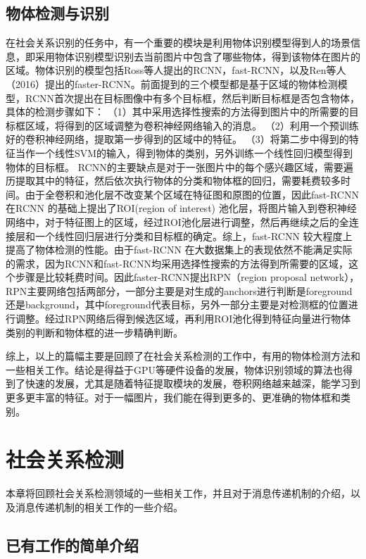 \subsection{物体检测与识别}

在社会关系识别的任务中，有一个重要的模块是利用物体识别模型得到人的场景信息，即采用物体识别模型识别去当前图片中包含了哪些物体，得到该物体在图片的区域。物体识别的模型包括Ross等人提出的RCNN\cite{DBLP:conf/cvpr/GirshickDDM14}，fast-RCNN\cite{DBLP:conf/iccv/Girshick15}，以及Ren等人（2016）\cite{DBLP:conf/nips/RenHGS15}提出的faster-RCNN。前面提到的三个模型都是基于区域的物体检测模型，RCNN\cite{DBLP:conf/cvpr/GirshickDDM14}首次提出在目标图像中有多个目标框，然后判断目标框是否包含物体，具体的检测步骤如下：
（1）其中采用选择性搜索的方法得到图片中的所需要的目标框区域，将得到的区域调整为卷积神经网络输入的消息。
（2）利用一个预训练好的卷积神经网络，提取第一步得到的区域中的特征。
（3）将第二步中得到的特征当作一个线性SVM的输入，得到物体的类别，另外训练一个线性回归模型得到物体的目标框。
RCNN的主要缺点是对于一张图片中的每个感兴趣区域，需要遍历提取其中的特征，然后依次执行物体的分类和物体框的回归，需要耗费较多时间。由于全卷积和池化层不改变某个区域在特征图和原图的位置，因此fast-RCNN 在RCNN 的基础上提出了ROI(region of interest) 池化层，将图片输入到卷积神经网络中，对于特征图上的区域，经过ROI池化层进行调整，然后再继续之后的全连接层和一个线性回归层进行分类和目标框的确定。综上，fast-RCNN 较大程度上提高了物体检测的性能。由于fast-RCNN 在大数据集上的表现依然不能满足实际的需求，因为RCNN和fast-RCNN均采用选择性搜索的方法得到所需要的区域，这个步骤是比较耗费时间。因此faster-RCNN提出RPN（region proposal network），RPN主要网络包括两部分，一部分主要是对生成的anchors进行判断是foreground还是background，其中foreground代表目标，另外一部分主要是对检测框的位置进行调整。经过RPN网络后得到候选区域，再利用ROI池化得到特征向量进行物体类别的判断和物体框的进一步精确判断。

综上，以上的篇幅主要是回顾了在社会关系检测的工作中，有用的物体检测方法和一些相关工作。结论是得益于GPU等硬件设备的发展，物体识别领域的算法也得到了快速的发展，尤其是随着特征提取模块的发展，卷积网络越来越深，能学习到更多更丰富的特征。对于一幅图片，我们能在得到更多的、更准确的物体框和类别。

\section{社会关系检测}
本章将回顾社会关系检测领域的一些相关工作，并且对于消息传递机制的介绍，以及消息传递机制的相关工作的一些介绍。

\subsection{已有工作的简单介绍}

